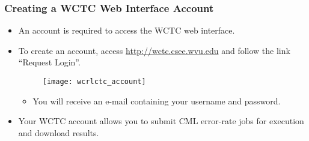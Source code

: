 \begin{frame}
  \frametitle{Creating a WCTC Web Interface Account}

  \begin{itemize}

  \item An account is required to access the WCTC web interface.

  \item To create an account, access \url{http://wctc.csee.wvu.edu} and follow the link ``Request Login''.

    \begin{figure}
      \centering
      \texttt{[image: wcrlctc\_account]}
    \end{figure}

    \begin{itemize}
    \item{ You will receive an e-mail containing your username and password. }
    \end{itemize}

  \item Your WCTC account allows you to submit CML error-rate jobs for execution and download results.

  \end{itemize}

\end{frame}
